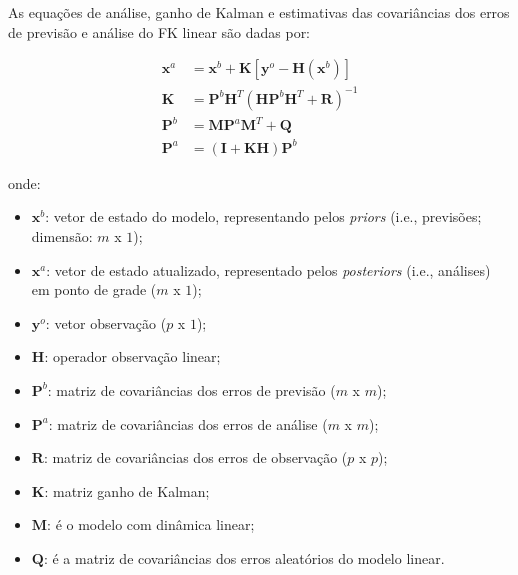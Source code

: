 As equações de análise, ganho de Kalman e estimativas das covariâncias dos erros de previsão e análise do FK linear são dadas por:

\begin{align}
    \label{eq:enkf_anl}
    \mathbf{x}^{a} & = \mathbf{x}^{b} + \mathbf{K}[\mathbf{y}^{o}-\mathbf{H}(\mathbf{x}^{b})] \\
    \label{eq:enkf_ganho}
    \mathbf{K} & =\mathbf{P}^{b}\mathbf{H}^T(\mathbf{HP}^{b}\mathbf{H}^T+\mathbf{R})^{-1} \\
    \label{eq:enkf_pb}
    \mathbf{P}^{b} & = \mathbf{M}\mathbf{P}^{a}\mathbf{M}^{T} + \mathbf{Q} \\
    \label{eq:enkf_pa}
    \mathbf{P}^{a} & =(\mathbf{I}+\mathbf{KH})\mathbf{P}^{b}
\end{align}

onde:

\begin{itemize}
    \item $\mathbf{x}^{b}$: vetor de estado do modelo, representando pelos \textit{priors} (i.e., previsões; dimensão: $m$ x $1$);
    \item $\mathbf{x}^{a}$: vetor de estado atualizado, representado pelos \textit{posteriors} (i.e., análises) em ponto de grade ($m$ x $1$);
    \item $\mathbf{y}^{o}$: vetor observação ($p$ x $1$);
    \item $\mathbf{H}$: operador observação linear;
    \item $\mathbf{P}^{b}$: matriz de covariâncias dos erros de previsão ($m$ x $m$);
    \item $\mathbf{P}^{a}$: matriz de covariâncias dos erros de análise ($m$ x $m$);
    \item $\mathbf{R}$: matriz de covariâncias dos erros de observação ($p$ x $p$);
    \item $\mathbf{K}$: matriz ganho de Kalman;
    \item $\mathbf{M}$: é o modelo com dinâmica linear;
    \item $\mathbf{Q}$: é a matriz de covariâncias dos erros aleatórios do modelo linear.
\end{itemize}


